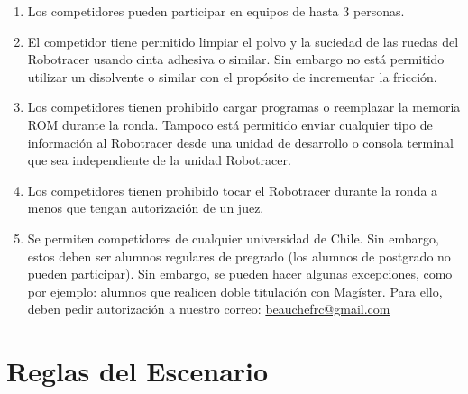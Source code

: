 \begin{enumerate}
  \item Los competidores pueden participar en equipos de hasta 3 personas.

  \item El competidor tiene permitido limpiar el polvo y la suciedad de las ruedas del Robotracer usando cinta adhesiva o similar. Sin embargo no está permitido utilizar un disolvente o similar con el propósito de incrementar la fricción.

  \item Los competidores tienen prohibido cargar programas o reemplazar la memoria ROM durante la ronda. Tampoco está permitido enviar cualquier tipo de información al Robotracer desde una unidad de desarrollo o consola terminal que sea independiente de la unidad Robotracer.

  \item Los competidores tienen prohibido tocar el Robotracer durante la ronda a menos que tengan autorización de un juez.

  \item Se permiten competidores de cualquier universidad de Chile. Sin embargo, estos deben ser alumnos regulares de pregrado (los alumnos de postgrado no pueden participar). Sin embargo, se pueden hacer algunas excepciones, como por ejemplo: alumnos que realicen doble titulación con Magíster. Para ello, deben pedir autorización a nuestro correo: \href{mailto:beauchefrc@gmail.com}{beauchefrc@gmail.com}
\end{enumerate}

\section{Reglas del Escenario}

